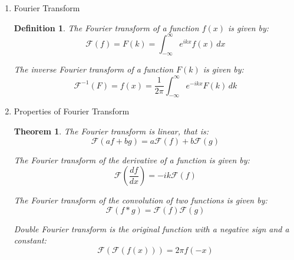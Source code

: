 \documentclass{article}
\newtheorem{definition}{Definition}[section]
\newtheorem{theorem}{Theorem}[section]
\begin{document}
\begin{enumerate}
\begin{proof}
              The general solution is then:
              \begin{equation}
                  \phi(r, \theta) = \sum_{l=0}^{\infty}
                  A_{l} r^l
                  P_{l}(\cos \theta)
                  + \sum_{l=-1}^{-\infty}
                  B_{l} r^{l} P_{l}(\cos \theta)
              \end{equation}
          \end{proof}
    \item Fourier Transform
          \begin{definition}
              The Fourier transform of a function $f(x)$ is given by:
              \begin{equation}
                  \mathcal{F}(f) =  F(k) = \int_{-\infty}^{\infty} e^{ikx} f(x)  \, dx
              \end{equation}

              The inverse Fourier transform of a function $F(k)$ is given by:
              \begin{equation}
                  \mathcal{F}^{-1}(F) = f(x) = \frac{1}{2\pi} \int_{-\infty}^{\infty} e^{-ikx} F(k) \, dk
              \end{equation}
          \end{definition}
    \item Properties of Fourier Transform
          \begin{theorem}
              The Fourier transform is linear, that is:
              \begin{equation}
                  \mathcal{F}(a f + b g) = a \mathcal{F}(f) + b \mathcal{F}(g)
              \end{equation}

              The Fourier transform of the derivative of a function is given by:
              \begin{equation}
                  \mathcal{F}(\frac{df}{dx}) = -ik \mathcal{F}(f)
              \end{equation}

              The Fourier transform of the convolution of two functions is given by:
              \begin{equation}
                  \mathcal{F}(f * g) = \mathcal{F}(f) \mathcal{F}(g)
              \end{equation}

              Double Fourier transform is the original function with a negative sign and a constant:
                \begin{equation}
                    \mathcal{F}(\mathcal{F}(f(x))) = 2\pi f(-x)
                \end{equation}
          \end{theorem}
\end{enumerate}
\end{document}
